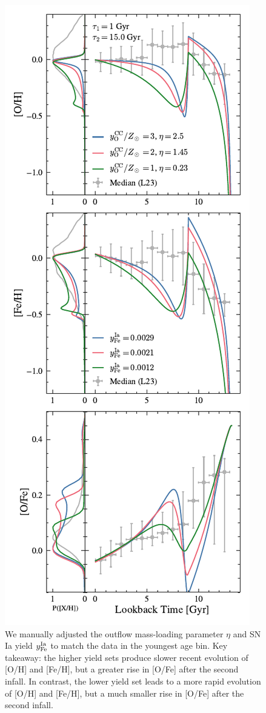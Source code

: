 \documentclass[twocolumn,twocolappendix,linenumbers]{aastex631}
\begin{document}

\begin{figure}
    \centering
    \includegraphics{figures/yield_outflow.pdf}
    \caption{We manually adjusted the outflow mass-loading parameter $\eta$ and SN Ia yield $y ^{\rm Ia}_{\rm Fe}$ to match the data in the youngest age bin. Key takeaway: the higher yield sets produce slower recent evolution of [O/H] and [Fe/H], but a greater rise in [O/Fe] after the second infall. In contrast, the lower yield set leads to a more rapid evolution of [O/H] and [Fe/H], but a much smaller rise in [O/Fe] after the second infall.}
    \label{fig:onezone-dtd}
\end{figure}
\end{document}
